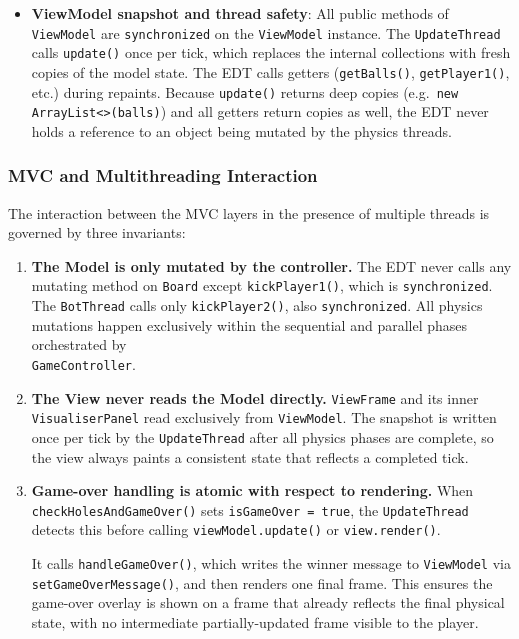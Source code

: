 \documentclass[12pt,a4paper]{article}
\begin{document}
\begin{itemize}
	\item \textbf{ViewModel snapshot and thread safety}: All public methods of \texttt{ViewModel} are \texttt{synchronized} on the
\texttt{ViewModel} instance. The \texttt{UpdateThread} calls \texttt{update()}
once per tick, which replaces the internal collections with fresh copies of the
model state. The EDT calls getters (\texttt{getBalls()}, \texttt{getPlayer1()},
etc.) during repaints. Because \texttt{update()} returns deep copies
(e.g.\ \texttt{new ArrayList<>(balls)}) and all getters return copies as well, the
EDT never holds a reference to an object being mutated by the physics threads.
\end{itemize}
 
\subsubsection{MVC and Multithreading Interaction}
 
The interaction between the MVC layers in the presence of multiple threads is
governed by three invariants:
 
\begin{enumerate}
    \item \textbf{The Model is only mutated by the controller.}
          The EDT never calls any mutating method on \texttt{Board} except
          \texttt{kickPlayer1()}, which is \texttt{synchronized}. The \texttt{BotThread}
          calls only \texttt{kickPlayer2()}, also \texttt{synchronized}. All physics
          mutations happen exclusively within the sequential and parallel phases
          orchestrated by\\
\texttt{GameController}.
 
    \item \textbf{The View never reads the Model directly.}
          \texttt{ViewFrame} and its inner\\
\texttt{VisualiserPanel} read exclusively
          from \texttt{ViewModel}. The snapshot is written once per tick by the
          \texttt{UpdateThread} after all physics phases are complete, so the view
          always paints a consistent state that reflects a completed tick.
 
    \item \textbf{Game-over handling is atomic with respect to rendering.}
          When\\
\texttt{checkHolesAndGameOver()} sets \texttt{isGameOver = true}, the
          \texttt{UpdateThread} detects this before calling \texttt{viewModel.update()}
          or \texttt{view.render()}.

It calls \texttt{handleGameOver()}, which writes
          the winner message to \texttt{ViewModel} via \texttt{setGameOverMessage()},
          and then renders one final frame. This ensures the game-over overlay is
          shown on a frame that already reflects the final physical state, with no
          intermediate partially-updated frame visible to the player.
\end{enumerate}
\end{document}
